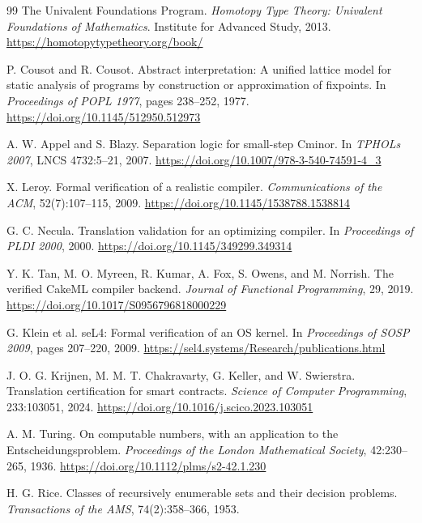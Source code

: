 \begin{thebibliography}{99}
The Univalent Foundations Program.
\newblock \emph{Homotopy Type Theory: Univalent Foundations of Mathematics}.
\newblock Institute for Advanced Study, 2013.
\newblock \url{https://homotopytypetheory.org/book/}

P. Cousot and R. Cousot.
\newblock Abstract interpretation: A unified lattice model for static analysis of
programs by construction or approximation of fixpoints.
\newblock In \emph{Proceedings of POPL 1977}, pages 238--252, 1977.
\newblock \url{https://doi.org/10.1145/512950.512973}

A. W. Appel and S. Blazy.
\newblock Separation logic for small-step Cminor.
\newblock In \emph{TPHOLs 2007}, LNCS 4732:5--21, 2007.
\newblock \url{https://doi.org/10.1007/978-3-540-74591-4_3}

X. Leroy.
\newblock Formal verification of a realistic compiler.
\newblock \emph{Communications of the ACM}, 52(7):107--115, 2009.
\newblock \url{https://doi.org/10.1145/1538788.1538814}

G. C. Necula.
\newblock Translation validation for an optimizing compiler.
\newblock In \emph{Proceedings of PLDI 2000}, 2000.
\newblock \url{https://doi.org/10.1145/349299.349314}

Y. K. Tan, M. O. Myreen, R. Kumar, A. Fox, S. Owens, and M. Norrish.
\newblock The verified CakeML compiler backend.
\newblock \emph{Journal of Functional Programming}, 29, 2019.
\newblock \url{https://doi.org/10.1017/S0956796818000229}

G. Klein et al.
\newblock seL4: Formal verification of an OS kernel.
\newblock In \emph{Proceedings of SOSP 2009}, pages 207--220, 2009.
\newblock \url{https://sel4.systems/Research/publications.html}

J. O. G. Krijnen, M. M. T. Chakravarty, G. Keller, and W. Swierstra.
\newblock Translation certification for smart contracts.
\newblock \emph{Science of Computer Programming}, 233:103051, 2024.
\newblock \url{https://doi.org/10.1016/j.scico.2023.103051}

A. M. Turing.
\newblock On computable numbers, with an application to the Entscheidungsproblem.
\newblock \emph{Proceedings of the London Mathematical Society}, 42:230--265, 1936.
\newblock \url{https://doi.org/10.1112/plms/s2-42.1.230}

H. G. Rice.
\newblock Classes of recursively enumerable sets and their decision problems.
\newblock \emph{Transactions of the AMS}, 74(2):358--366, 1953.


\end{thebibliography}
